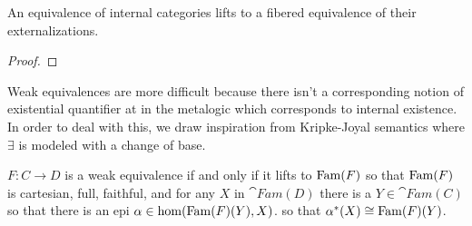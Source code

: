 \begin{thm}\label{thm:complete:equivalencelifts}
  An equivalence of internal categories lifts to a fibered equivalence
  of their externalizations.
\end{thm}
\begin{proof}
\end{proof}
Weak equivalences are more difficult because there isn't a
corresponding notion of existential quantifier at in the metalogic
which corresponds to internal existence. In order to deal with this,
we draw inspiration from Kripke-Joyal semantics where $\exists$ is
modeled with a change of base.
\begin{thm}\label{thm:complete:weakequivalencelifts}
  $F : C \to D$ is a weak equivalence if and only if it lifts to
  $\operatorname{Fam}(F)$ so that $\operatorname{Fam}(F)$ is cartesian, full, faithful, and
  for any $X$ in $\cat{Fam}(D)$ there is a $Y \in \cat{Fam}(C)$ so
  that there is an epi $\alpha \in \hom(\operatorname{Fam}(F)(Y), X)$. so that
  $\alpha^*(X) \cong \operatorname{Fam}(F)(Y)$.
\end{thm}
